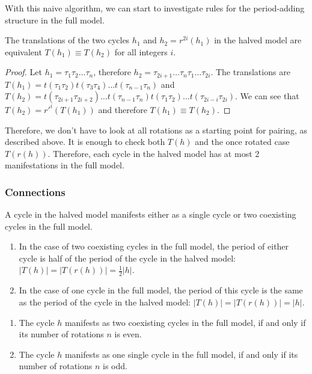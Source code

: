 With this naive algorithm, we can start to investigate rules for the period-adding structure in the full model.

\begin{lemma}
	The translations of the two cycles $h_1$ and $h_2 = r^{2i}(h_1)$ in the halved model are equivalent $T(h_1) \equiv T(h_2)$ for all integers $i$.
\end{lemma}

\begin{proof}
	Let $h_1 = \tau_1\tau_2 \dots \tau_n$, therefore $h_2 = \tau_{2i+1} \dots \tau_n\tau_1 \dots \tau_{2i}$.
	The translations are $T(h_1) = t(\tau_1\tau_2)t(\tau_3\tau_4) \dots t(\tau_{n-1}\tau_n)$
	and $T(h_2) = t(\tau_{2i+1}\tau_{2i+2}) \dots t(\tau_{n-1}\tau_n)t(\tau_1\tau_2) \dots t(\tau_{2i-i}\tau_{2i})$.
	We can see that $T(h_2) = r'^i(T(h_1))$ and therefore $T(h_1) \equiv T(h_2)$.
\end{proof}

Therefore, we don't have to look at all rotations as a starting point for pairing, as described above.
It is enough to check both $T(h)$ and the once rotated case $T(r(h))$.
Therefore, each cycle in the halved model has at most 2 manifestations in the full model.

\subsubsection{Connections}

\begin{theorem}
	A cycle in the halved model manifests either as a single cycle or two coexisting cycles in the full model.
\end{theorem}

\begin{theorem}
	\begin{enumerate}
		\item In the case of two coexisting cycles in the full model, the period of either cycle is half of the period of the cycle in the halved model: $|T(h)| = |T(r(h))| = \frac{1}{2} |h|$.
		\item In the case of one cycle in the full model, the period of this cycle is the same as the period of the cycle in the halved model: $|T(h)| = |T(r(h))| = |h|$.
	\end{enumerate}
\end{theorem}

\begin{theorem}
	\label{theorem:coex.even.odd}
	\begin{enumerate}
		\item The cycle $h$ manifests as two coexisting cycles in the full model, if and only if its number of rotations $n$ is even.
		\item The cycle $h$ manifests as one single cycle in the full model, if and only if its number of rotations $n$ is odd.
	\end{enumerate}
\end{theorem}

